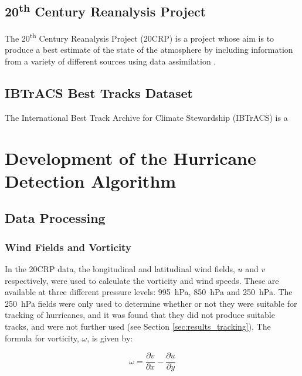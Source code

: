 \documentclass[pdftex,12pt,a4paper]{report}
\newcommand{\ts}{\textsuperscript}
\begin{document}
\section{20\ts{th} Century Reanalysis Project}
\label{sec:20crp}
The 20\ts{th} Century Reanalysis Project (20CRP) is a project whose aim is to produce a best estimate of
the state of the atmosphere by including information from a variety of different sources using data
assimilation \parencite{compoTwentieth2011}.

\section{IBTrACS Best Tracks Dataset}
\label{sec:ibtracs}
The International Best Track Archive for Climate Stewardship (IBTrACS)
\parencite{knappInternational2010} is a

\chapter{Development of the Hurricane Detection Algorithm}
\label{chap:development}


\section{Data Processing}

\subsection{Wind Fields and Vorticity}

In the 20CRP data, the longitudinal and latitudinal wind fields, $u$ and $v$ respectively, were used
to calculate the vorticity and wind speeds. These are available at three different pressure levels:
\SI{995}{hPa}, \SI{850}{hPa} and \SI{250}{hPa}. The \SI{250}{hPa} fields were only used to determine
whether or not they were suitable for tracking of hurricanes, and it was found that they did not
produce suitable tracks, and were not further used (see Section \ref{sec:results_tracking}). The
formula for vorticity, $\omega$, is given by:

\begin{equation}
    \omega = \frac{\partial v}{\partial x} - \frac{\partial u}{\partial y}
    \label{eqn:vorticity}
\end{equation}
\end{document}
